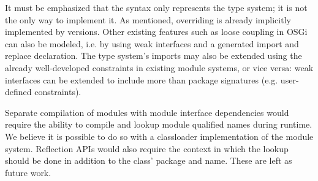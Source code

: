 
It must be emphasized that the syntax only represents the type system; it is not the only way
to implement it. As mentioned, overriding is already implicitly implemented
by versions. Other existing features such as loose coupling in OSGi can
also be modeled, i.e. by using weak interfaces and a generated import and replace
declaration. The type system's imports may also be extended using the already well-developed
constraints in existing module systems, or vice versa: weak interfaces can be extended
to include more than package signatures (e.g. user-defined constraints).

Separate compilation of modules with module interface dependencies would require
the ability to compile and lookup module qualified names during runtime. We believe
it is possible to do so with a classloader implementation of the module system. Reflection
APIs would also require the context in which the lookup should be done in addition to
the class' package and name. These are left as future work.

